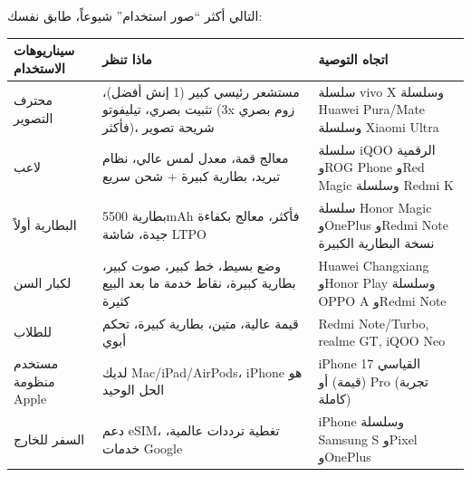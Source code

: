 
التالي أكثر “صور استخدام” شيوعاً، طابق نفسك:

\begin{center}
\begin{tabularx}{\linewidth}{|X|X|X|}
\hline
\textbf{سيناريوهات الاستخدام} & \textbf{ماذا تنظر} & \textbf{اتجاه التوصية} \tabularnewline
\hline
محترف التصوير & مستشعر رئيسي كبير (1 إنش أفضل)، تثبيت بصري، تيليفوتو (3x زوم بصري فأكثر)، شريحة تصوير & سلسلة vivo X وسلسلة Huawei Pura/Mate وسلسلة Xiaomi Ultra \tabularnewline
لاعب & معالج قمة، معدل لمس عالي، نظام تبريد، بطارية كبيرة + شحن سريع & سلسلة iQOO الرقمية وROG Phone وRed Magic وسلسلة Redmi K \tabularnewline
البطارية أولاً & بطارية 5500mAh فأكثر، معالج بكفاءة جيدة، شاشة LTPO & سلسلة Honor Magic وOnePlus وRedmi Note نسخة البطارية الكبيرة \tabularnewline
لكبار السن & وضع بسيط، خط كبير، صوت كبير، بطارية كبيرة، نقاط خدمة ما بعد البيع كثيرة & Huawei Changxiang وHonor Play وسلسلة OPPO A وRedmi Note \tabularnewline
للطلاب & قيمة عالية، متين، بطارية كبيرة، تحكم أبوي & Redmi Note/Turbo, realme GT, iQOO Neo \tabularnewline
مستخدم منظومة Apple & لديك Mac/iPad/AirPods، iPhone هو الحل الوحيد & iPhone 17 القياسي (قيمة) أو Pro (تجربة كاملة) \tabularnewline
السفر للخارج & دعم eSIM، تغطية ترددات عالمية، خدمات Google & iPhone وسلسلة Samsung S وPixel وOnePlus \tabularnewline
\hline
\end{tabularx}
\end{center}


